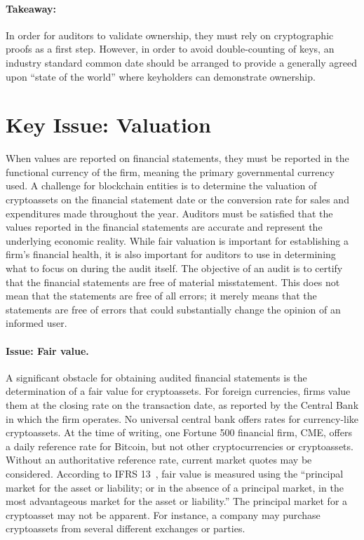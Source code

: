 \paragraph{Takeaway:} In order for auditors to validate ownership, they must rely on cryptographic proofs as a first step. However, in order to avoid double-counting of keys, an industry standard common date should be arranged to provide a generally agreed upon ``state of the world'' where keyholders can demonstrate ownership. 

\section{Key Issue: Valuation}
When values are reported on financial statements, they must be reported in the functional currency of the firm, meaning the primary governmental currency used. A challenge for blockchain entities is to determine the valuation of cryptoassets on the financial statement date or the conversion rate for sales and expenditures made throughout the year. Auditors must be satisfied that the values reported in the financial statements are accurate and represent the underlying economic reality. While fair valuation is important for establishing a firm{'}s financial health, it is also important for auditors to use in determining what to focus on during the audit itself. The objective of an audit is to certify that the financial statements are free of material misstatement. This does not mean that the statements are free of all errors; it merely means that the statements are free of errors that could substantially change the opinion of an informed user. 

\paragraph{Issue: Fair value.} A significant obstacle for obtaining audited financial statements is the determination of a fair value for cryptoassets. For foreign currencies, firms value them at the closing rate on the transaction date, as reported by the Central Bank in which the firm operates. No universal central bank offers rates for currency-like cryptoassets. At the time of writing, one Fortune 500 financial firm, CME, offers a daily reference rate for Bitcoin, but not other cryptocurrencies or cryptoassets. Without an authoritative reference rate, current market quotes may be considered. According to IFRS 13~\cite{ifrs201113}, fair value is measured using the ``principal market for the asset or liability; or  in the absence of a principal market, in the most advantageous market for the asset or liability.'' The principal market for a cryptoasset may not be apparent. For instance, a company may purchase cryptoassets from several different exchanges or parties. 

